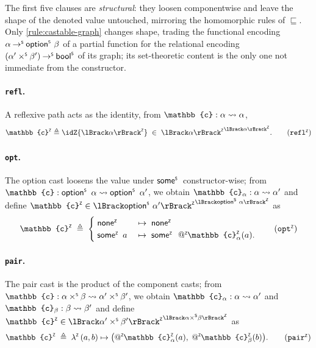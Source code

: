 The first five clauses are \emph{structural}: they loosen componentwise and leave the shape of the denoted value untouched, mirroring the homomorphic rules of $\sqsubseteq$. Only \ref{rule:castable-graph} changes shape, trading the functional encoding $\alpha \mathbin{\to^{\scriptscriptstyle{\mathsf{S}}}} \mathord{\mathsf{option}^{\scriptscriptstyle{\mathsf{S}}}}\,\,\beta$ of a partial function for the relational encoding $(\alpha' \mathbin{\times^{\scriptscriptstyle{\mathsf{S}}}} \beta') \mathbin{\to^{\scriptscriptstyle{\mathsf{S}}}} \mathsf{bool}^{\scriptscriptstyle{\mathsf{S}}}$ of its graph; its set-theoretic content is the only one not immediate from the constructor.

\paragraph{\texttt{refl}.} A reflexive path acts as the identity, \ie from \(\mathbb{c} : \castpath{\alpha}{\alpha}\),
\begin{equation}
  \label{eq:castZF-refl}
  \zop{\mathbb{c}} \triangleq \idZ{\interpZ{\alpha}} \;\in\; {\interpZ{\alpha}}^{\interpZ{\alpha}}. \tag{$\zop{\mathtt{refl}}$}
\end{equation}

\paragraph{\texttt{opt}.} The option cast loosens the value under $\mathord{\mathsf{some}^{\scriptscriptstyle{\mathsf{S}}}}\,$ constructor-wise; from \(\mathbb{c} : \castpath{\optS\ \alpha}{\optS\ \alpha'}\), we obtain \(\mathbb{c}_\alpha : \castpath{\alpha}{\alpha'}\) and define \(\zop{\mathbb{c}} \in {\interpZ{\optS\,\alpha'}}^{\interpZ{\optS\,\alpha}}\) as
\begin{equation}
  \label{eq:castZF-opt}
\zop{\mathbb{c}} \;\triangleq\;
\begin{cases}
  \;\noneZ &\;\mapsto\; \noneZ\\
  \;\someZ\ a &\;\mapsto\; \someZ\ \appZ \zop{\mathbb{c}}_\alpha(a).
\end{cases}
\tag{$\zop{\mathtt{opt}}$}
\end{equation}

\paragraph{\texttt{pair}.} The pair cast is the product of the component casts; from \(\mathbb{c} : \castpath{\alpha \timesS \beta}{\alpha' \timesS \beta'}\), we obtain \(\mathbb{c}_\alpha : \castpath{\alpha}{\alpha'}\) and \(\mathbb{c}_\beta : \castpath{\beta}{\beta'}\) and define \(\zop{\mathbb{c}} \in {\interpZ{\alpha' \timesS \beta'}}^{\interpZ{\alpha \timesS \beta}}\) as
\begin{equation}
  \label{eq:castZF-pair}
  \zop{\mathbb{c}} \;\triangleq\;
  \lamZ\,(a, b) \mapsto \bigl(\appZ \zop{\mathbb{c}}_\alpha(a),\; \appZ \zop{\mathbb{c}}_\beta(b)\bigr).
  \tag{$\zop{\mathtt{pair}}$}
\end{equation}

